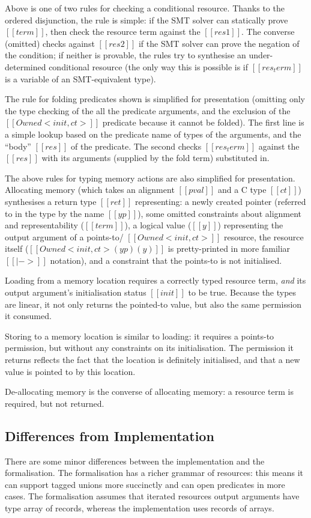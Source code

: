\documentclass[11pt]{article}%
\begin{document}
Above is one of two rules for checking a conditional resource.
Thanks to the ordered disjunction, the rule is simple: if the SMT
solver can statically prove $[[ term ]]$, then check the
resource term against the $[[ res1 ]]$. The converse (omitted) checks against
$[[ res2 ]]$ if the SMT solver can prove the negation of the condition; if
neither is provable, the rules try to synthesise an under-determined
conditional resource (the only way this is possible is if $[[ res_term ]]$ is a
variable of an SMT-equivalent type).

The rule for folding predicates shown is simplified for presentation (omitting
only the type checking of the all the predicate arguments, and the exclusion of
the $[[ Owned < init , ct > ]]$ predicate because it cannot be folded). The first line
is a simple lookup based on the predicate name of types of the arguments, and
the ``body'' $[[ res ]]$ of the predicate. The second checks $[[ res_term ]]$
against the $[[ res ]]$ with its arguments (supplied by the fold term)
substituted in.

The above rules for typing memory actions are also simplified for
presentation.  Allocating memory (which takes an alignment $[[ pval ]]$ and a C
type $[[ ct ]]$) synthesises a return type $[[ ret ]]$ representing: a newly
created pointer (referred to in the type by the name $[[ yp ]]$), some omitted
constraints about alignment and representability ($[[ term ]]$), a logical
value ($[[ y ]]$) representing the output argument of a points-to/
$[[ Owned< init , ct > ]]$ resource, the resource itself
($[[ Owned <init , ct> ( yp ) ( y ) ]]$ is pretty-printed in more familiar $[[ |-> ]]$
notation), and a constraint that the points-to is not initialised.

Loading from a memory location requires a correctly typed resource term,
\emph{and} its output argument's initialisation status $[[ init ]]$ to be
true. Because the types are linear, it not only returns the pointed-to value,
but also the same permission it consumed.

Storing to a memory location is similar to loading: it requires a points-to permission,
but without any constraints on its initialisation. The permission it returns
reflects the fact that the location is definitely initialised, and that a new
value is pointed to by this location.

De-allocating memory is the converse of allocating memory: a resource term is
required, but not returned.

\subsection{Differences from Implementation}

There are some minor differences between the implementation and the
formalisation. The formalisation has a richer grammar of resources:
this means it can support tagged unions more succinctly and can open
predicates in more cases. The formalisation assumes that iterated
resources output arguments have type array of records, whereas the
implementation uses records of arrays.


\end{document}
